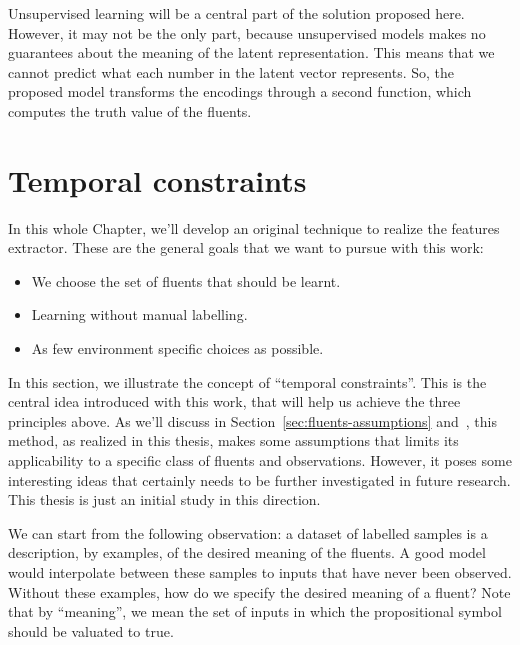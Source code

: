 Unsupervised learning will be a central part of the solution proposed here.
However, it may not be the only part, because unsupervised models makes no
guarantees about the meaning of the latent representation. This means that
we cannot predict what each number in the latent vector represents. So, the
proposed model transforms the encodings through a second function, which
computes the truth value of the fluents. 


\section{Temporal constraints}

In this whole Chapter, we'll develop an original technique to realize the
features extractor. These are the general goals that we want to pursue with
this work:
\begin{itemize}
	\item We choose the set of fluents that should be learnt.
	\item Learning without manual labelling.
	\item As few environment specific choices as possible.
\end{itemize}

In this section, we illustrate the concept of ``temporal constraints''. This
is the central idea introduced with this work, that will help us achieve
the three principles above. As we'll discuss in
Section~\ref{sec:fluents-assumptions} and~,
this method, as realized in this thesis, makes some assumptions that limits
its applicability to a specific class of fluents and observations. However, it
poses some interesting ideas that certainly needs to be further investigated
in future research. This thesis is just an initial study in this direction.

We can start from the following observation: a dataset of labelled samples is
a description, by examples, of the desired meaning of the fluents. A good
model would interpolate between these samples to inputs that have never been
observed. Without these examples, how do we specify the desired meaning of a
fluent? Note that by ``meaning'', we mean the set of inputs in which the
propositional symbol should be valuated to true.


